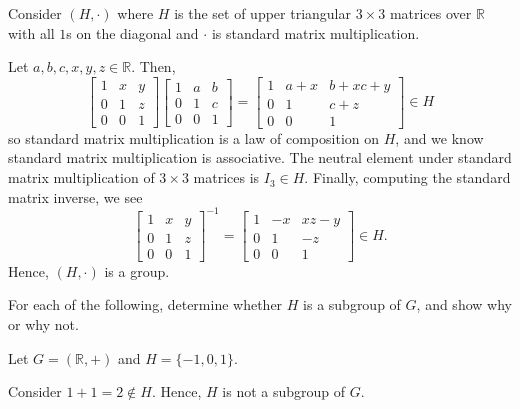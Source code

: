 \begin{exer}
Consider $ (H,\cdot) $ where $ H $ is the set of upper triangular $ 3\times 3 $ matrices over $ \mathbb{R} $ with all $ 1 $s on the diagonal and $ \cdot $ is standard matrix multiplication.
\end{exer}
\begin{sltn}
Let $ a,b,c,x,y,z\in\mathbb{R} $. Then,
\begin{equation*}
    \begin{bmatrix}
        1 & x & y \\
        0 & 1 & z \\
        0 & 0 & 1
    \end{bmatrix}
    \begin{bmatrix}
        1 & a & b \\
        0 & 1 & c \\
        0 & 0 & 1
    \end{bmatrix}
    =
    \begin{bmatrix}
        1 & a+x & b+xc+y \\
        0 & 1 & c+z \\
        0 & 0 & 1
    \end{bmatrix}
    \in H
\end{equation*}
so standard matrix multiplication is a law of composition on $ H $, and we know standard matrix multiplication is associative. The neutral element under standard matrix multiplication of $ 3\times 3 $ matrices is $ I_3\in H $. Finally, computing the standard matrix inverse, we see
\begin{equation*}
    \begin{bmatrix}
        1 & x & y \\
        0 & 1 & z \\
        0 & 0 & 1
    \end{bmatrix}^{-1}
    =
    \begin{bmatrix}
        1 & -x & xz-y \\
        0 & 1 & -z \\
        0 & 0 & 1
    \end{bmatrix}
    \in H.
\end{equation*}
Hence, $ (H,\cdot) $ is a group.
\end{sltn}

For each of the following, determine whether $ H $ is a subgroup of $ G $, and show why or why not.

\begin{exer}
Let $ G=(\mathbb{R},+) $ and $ H=\{-1,0,1\} $.
\end{exer}
\begin{sltn}
Consider $ 1+1=2\notin H $. Hence, $ H $ is not a subgroup of $ G $.
\end{sltn}

